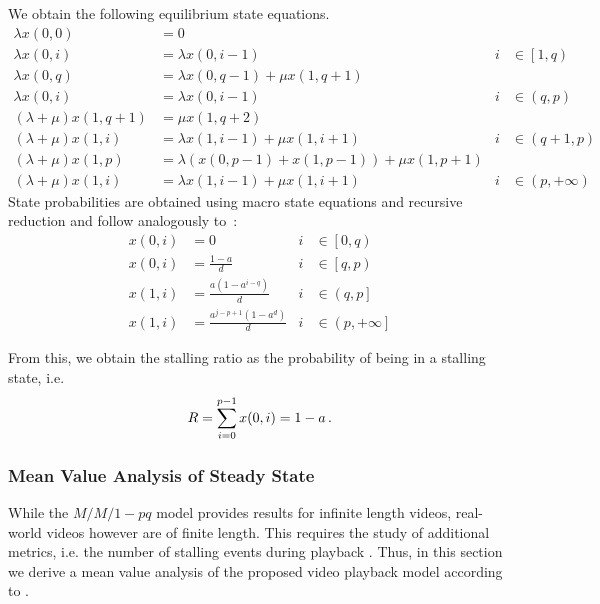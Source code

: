 We obtain the following equilibrium state equations.
\begin{align*}
  \lambda x(0, 0) &= 0 & &\\
  \lambda x(0, i) &= \lambda x(0, i-1) & i&\in \left[1, q\right)\\
  \lambda x(0, q) &= \lambda x(0, q-1) + \mu x(1, q+1) & &\\
  \lambda x(0, i) &= \lambda x(0, i-1) & i&\in\left(q, p\right)\\
  (\lambda + \mu) x(1, q+1) &= \mu x(1, q+2) & &\\
  (\lambda + \mu) x(1, i) &= \lambda x(1, i-1) + \mu x(1, i+1) & i&\in\left(q+1, p\right)\\
  (\lambda + \mu) x(1, p) &= \lambda (x(0,p-1) + x(1, p-1)) + \mu x(1, p+1) & &\\
  (\lambda + \mu) x(1, i) &= \lambda x(1, i-1) + \mu x(1, i+1) & i&\in\left(p, +\infty\right)
\end{align*}
State probabilities are obtained using macro state equations and recursive reduction and follow analogously to~\cite{Zhang2004}:
\begin{align*}
x(0, i) &= 0 & i&\in \left[0,q\right)\\ 
x(0, i) &= \frac{1-a}{d} &i&\in \left[q,p\right)\\
x(1, i) &= \frac{a(1- a^{i-q})}{d} &i&\in \left(q,p\right]\\
x(1, i) &= \frac{a^{j-p+1}(1-a^{d})}{d} &i&\in \left(p,+\infty\right]
\end{align*}

From this, we obtain the stalling ratio \stallingRatio as the probability of being in a stalling state, i.e.
\begin{equation}
R = \sum_{i=0}^{p-1} x(0, i) = 1-a \, .
\label{eq:application:qoe_user_behaviour:system_model:mm1pq:stalling_ratio_queuing}
\end{equation}

\subsubsection*{Mean Value Analysis of Steady State}\label{sec:application:qoe_user_behaviour:system_model:steady_state}
While the \(M/M/1-pq\) model provides results for infinite length videos, real-world videos however are of finite length.
This requires the study of additional metrics, i.e. the number of stalling events during playback \numberStallingEvents.
Thus, in this section we derive a mean value analysis of the proposed video playback model according to .

